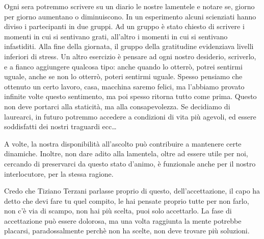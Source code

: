 \documentclass[12pt]{book} %
\begin{document}
\begin{mdframed}[linewidth=1pt]
Ogni sera potremmo scrivere su un diario le nostre lamentele e notare se, giorno per giorno
aumentano o diminuiscono. In un esperimento alcuni scienziati hanno diviso i partecipanti in due gruppi. Ad
un gruppo è stato chiesto di scrivere i momenti in cui si sentivano grati, all'altro i momenti in
cui si sentivano infastiditi. Alla fine della giornata, il gruppo della gratitudine evidenziava livelli inferiori di stress.
Un altro esercizio è pensare ad ogni nostro desiderio, scriverlo, e a fianco aggiungere qualcosa tipo: anche quando lo otterrò, potrei sentirmi uguale, anche se non lo otterrò, poteri sentirmi uguale.
Spesso pensiamo che ottenuto un certo lavoro, casa, macchina saremo felici, ma l'abbiamo provato infinite volte questo sentimento, ma poi spesso ritorna tutto come prima. Questo non deve portarci alla staticità, ma alla consapevolezza. Se decidiamo di laurearci, in futuro potremmo accedere a condizioni di vita più agevoli, ed essere soddisfatti dei nostri traguardi ecc…

A volte, la nostra disponibilità all’ascolto può contribuire a mantenere certe dinamiche. Inoltre, non dare adito alla lamentela, oltre ad essere utile per noi, cercando di preservarci da questo stato d'animo, è funzionale anche per il nostro interlocutore, per la stessa ragione.
\end{mdframed}

Credo che Tiziano Terzani parlasse proprio di questo, dell'accettazione, il capo ha detto che devi
fare tu quel compito, le hai pensate proprio tutte per non farlo, non c'è via di scampo, non hai
più scelta, puoi solo accettarlo. La fase di accettazione può essere dolorosa, ma una volta raggiunta la mente potrebbe placarsi, paradossalmente perchè non ha scelte, non deve trovare più soluzioni.
\end{document}
